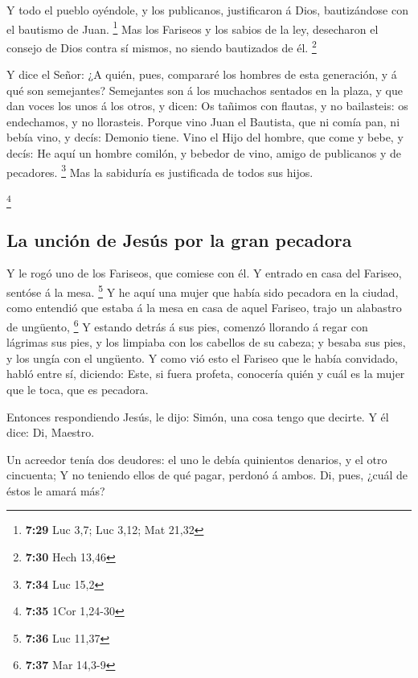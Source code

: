  Y todo el pueblo oyéndole, y los publicanos,
justificaron á Dios, bautizándose con el bautismo de Juan. \footnote{\textbf{7:29}
  Luc 3,7; Luc 3,12; Mat 21,32}  Mas los Fariseos y los
sabios de la ley, desecharon el consejo de Dios contra sí mismos, no
siendo bautizados de él. \footnote{\textbf{7:30} Hech 13,46}

 Y dice el Señor: ¿A quién, pues, compararé los hombres
de esta generación, y á qué son semejantes?  Semejantes
son á los muchachos sentados en la plaza, y que dan voces los unos á los
otros, y dicen: Os tañimos con flautas, y no bailasteis: os endechamos,
y no llorasteis.  Porque vino Juan el Bautista, que ni
comía pan, ni bebía vino, y decís: Demonio tiene.  Vino
el Hijo del hombre, que come y bebe, y decís: He aquí un hombre comilón,
y bebedor de vino, amigo de publicanos y de pecadores. \footnote{\textbf{7:34}
  Luc 15,2}  Mas la sabiduría es justificada de todos sus
hijos.

\footnote{\textbf{7:35} 1Cor 1,24-30}

\hypertarget{la-unciuxf3n-de-jesuxfas-por-la-gran-pecadora}{%
\subsection{La unción de Jesús por la gran
pecadora}\label{la-unciuxf3n-de-jesuxfas-por-la-gran-pecadora}}

 Y le rogó uno de los Fariseos, que comiese con él. Y
entrado en casa del Fariseo, sentóse á la mesa. \footnote{\textbf{7:36}
  Luc 11,37}  Y he aquí una mujer que había sido pecadora
en la ciudad, como entendió que estaba á la mesa en casa de aquel
Fariseo, trajo un alabastro de ungüento, \footnote{\textbf{7:37} Mar
  14,3-9}  Y estando detrás á sus pies, comenzó llorando
á regar con lágrimas sus pies, y los limpiaba con los cabellos de su
cabeza; y besaba sus pies, y los ungía con el ungüento. 
Y como vió esto el Fariseo que le había convidado, habló entre sí,
diciendo: Este, si fuera profeta, conocería quién y cuál es la mujer que
le toca, que es pecadora.

 Entonces respondiendo Jesús, le dijo: Simón, una cosa
tengo que decirte. Y él dice: Di, Maestro.

 Un acreedor tenía dos deudores: el uno le debía
quinientos denarios, y el otro cincuenta;  Y no teniendo
ellos de qué pagar, perdonó á ambos. Di, pues, ¿cuál de éstos le amará
más?

